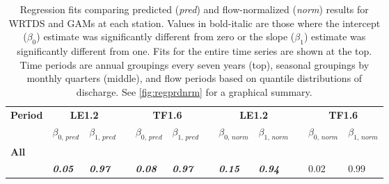 \documentclass[letterpaper,12pt,oneside]{article}\usepackage[]{graphicx}\usepackage[]{color}
\begin{document}
\begin{table}[!tbp]
\caption{Regression fits comparing predicted ({\it pred}) and flow-normalized ({\it norm}) results for \ac{WRTDS} and \acp{GAM} at each station.  Values in bold-italic are those where the intercept ($\beta_0$) estimate was significantly different from zero or the slope ($\beta_{1}$) estimate was significantly different from one. Fits for the entire time series are shown at the top.  Time periods are annual groupings every seven years (top), seasonal groupings by monthly quarters (middle), and flow periods based on quantile distributions of discharge.  See \cref{fig:regprdnrm} for a graphical summary.\label{tab:regprdnrm}} 
\begin{center}
\begin{tabular}{lllcllcllcll}
\hline\hline
\multicolumn{1}{l}{\bfseries Period}&\multicolumn{2}{c}{\bfseries LE1.2}&\multicolumn{1}{c}{\bfseries }&\multicolumn{2}{c}{\bfseries TF1.6}&\multicolumn{1}{c}{\bfseries }&\multicolumn{2}{c}{\bfseries LE1.2}&\multicolumn{1}{c}{\bfseries }&\multicolumn{2}{c}{\bfseries TF1.6}\tabularnewline
\cline{2-3} \cline{5-6} \cline{8-9} \cline{11-12}
\multicolumn{1}{l}{}&\multicolumn{1}{c}{$\beta_{0,\,pred}$}&\multicolumn{1}{c}{$\beta_{1,\,pred}$}&\multicolumn{1}{c}{}&\multicolumn{1}{c}{$\beta_{0,\,pred}$}&\multicolumn{1}{c}{$\beta_{1,\,pred}$}&\multicolumn{1}{c}{}&\multicolumn{1}{c}{$\beta_{0,\,norm}$}&\multicolumn{1}{c}{$\beta_{1,\,norm}$}&\multicolumn{1}{c}{}&\multicolumn{1}{c}{$\beta_{0,\,norm}$}&\multicolumn{1}{c}{$\beta_{1,\,norm}$}\tabularnewline
\hline
{\bfseries All}&&&&&&&&&&&\tabularnewline
~~&{\bf \textit{0.05}}&{\bf \textit{0.97}}&&{\bf \textit{0.08}}&{\bf \textit{0.97}}&&{\bf \textit{0.15}}&{\bf \textit{0.94}}&&0.02&0.99\tabularnewline

\end{tabular}
\end{center}
\end{table}
\end{document}
